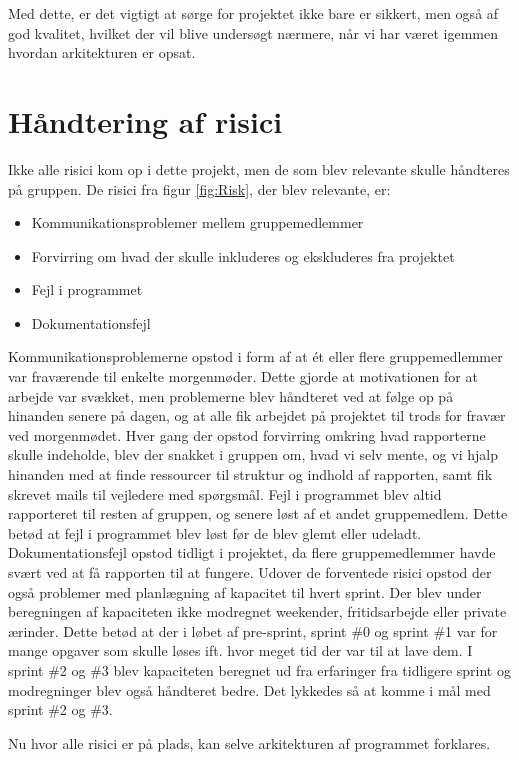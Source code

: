 Med dette, er det vigtigt at sørge for projektet ikke bare er sikkert, men også af god kvalitet, hvilket der vil blive undersøgt nærmere, når vi har været igemmen hvordan arkitekturen er opsat. 


\section{Håndtering af risici}\label{sec:handling_risks}
Ikke alle risici kom op i dette projekt, men de som blev relevante skulle håndteres på gruppen. De risici fra figur \ref{fig:Risk}, der blev relevante, er:
\begin{itemize}
    \item Kommunikationsproblemer mellem gruppemedlemmer
    \item Forvirring om hvad der skulle inkluderes og ekskluderes fra projektet
    \item Fejl i programmet
    \item Dokumentationsfejl
\end{itemize}

Kommunikationsproblemerne opstod i form af at ét eller flere gruppemedlemmer var fraværende til enkelte morgenmøder. Dette gjorde at motivationen for at arbejde var svækket, men problemerne blev håndteret ved at følge op på hinanden senere på dagen, og at alle fik arbejdet på projektet til trods for fravær ved morgenmødet. 
Hver gang der opstod forvirring omkring hvad rapporterne skulle indeholde, blev der snakket i gruppen om, hvad vi selv mente, og vi hjalp hinanden med at finde ressourcer til struktur og indhold af rapporten, samt fik skrevet mails til vejledere med spørgsmål.
Fejl i programmet blev altid rapporteret til resten af gruppen, og senere løst af et andet gruppemedlem. Dette betød at fejl i programmet blev løst før de blev glemt eller udeladt. 
Dokumentationsfejl opstod tidligt i projektet, da flere gruppemedlemmer havde svært ved at få rapporten til at fungere. 
Udover de forventede risici opstod der også problemer med planlægning af kapacitet til hvert sprint. Der blev under beregningen af kapaciteten ikke modregnet weekender, fritidsarbejde eller private ærinder. Dette betød at der i løbet af pre-sprint, sprint \#0 og sprint \#1 var for mange opgaver som skulle løses ift. hvor meget tid der var til at lave dem. I sprint \#2 og \#3 blev kapaciteten beregnet ud fra erfaringer fra tidligere sprint og modregninger blev også håndteret bedre. Det lykkedes så at komme i mål med sprint \#2 og \#3.

Nu hvor alle risici er på plads, kan selve arkitekturen af programmet forklares.